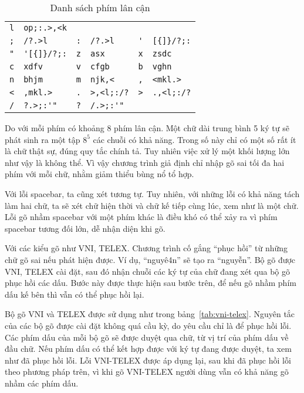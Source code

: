 \documentclass[a4paper,oneside,14pt]{extbook} %
\begin{document}
\begin{table}[htbp]
\begin{tabular}{ll|ll|ll}
\verb#l#&\verb#op;:.>,<k#\\
\verb#;#&\verb#/?.>l#&%
\verb#:#&\verb#/?.>l#&%
\verb#'#&\verb#[{]}/?;:#\\
\verb#"#&\verb#'[{]}/?;:#&%
\verb#z#&\verb#asx#&%
\verb#x#&\verb#zsdc#\\
\verb#c#&\verb#xdfv#&%
\verb#v#&\verb#cfgb#&%
\verb#b#&\verb#vghn#\\
\verb#n#&\verb#bhjm#&%
\verb#m#&\verb#njk,<#&%
\verb#,#&\verb#<mkl.>#\\
\verb#<#&\verb#,mkl.>#&%
\verb#.#&\verb#>,<l;:/?#&%
\verb#>#&\verb#.,<l;:/?#\\
\verb#/#&\verb#?.>;:'"#&%
\verb#?#&\verb#/.>;:'"#&%
\end{tabular}
  \caption{Danh sách phím lân cận}
  \label{tab:neighbor-keys}
\end{table}


Do với mỗi phím có khoảng 8 phím lân cận. Một chữ dài trung bình 5 ký
tự sẽ phát sinh ra một tập $8^5$ các chuỗi có khả năng. Trong số này
chỉ có một số rất ít là chữ thật sự, đúng quy tắc chính tả. Tuy nhiên
việc xử lý một khối lượng lớn như vậy là không thể. Vì vậy chương
trình giả định chỉ nhập gõ sai tối đa hai phím với mỗi chữ, nhằm giảm
thiểu bùng nổ tổ hợp.

Với lỗi spacebar, ta cũng xét tương tự. Tuy nhiên, với những lỗi có
khả năng tách làm hai chữ, ta sẽ xét chữ hiện thời và chữ kế tiếp cùng
lúc, xem như là một chữ. Lỗi gõ nhầm spacebar với một phím khác là
điều khó có thể xảy ra vì phím spacebar tương đối lớn, dễ nhận diện
khi gõ.

Với các kiểu gõ như VNI, TELEX. Chương trình cố gắng ``phục hồi'' từ
những chữ gõ sai nếu phát hiện được. Ví dụ, ``nguyê4n'' sẽ tạo ra
``nguyễn''. Bộ gõ được  VNI, TELEX cài đặt, sau đó nhận chuỗi các ký tự
của chữ đang xét qua bộ gõ phục hồi các dấu. Bước này được thực hiện
sau bước trên, để nếu gõ nhầm phím dấu kế bên thì vẫn có thể phục hồi
lại.

Bộ gõ VNI và TELEX được sử dụng như trong
bảng~\ref{tab:vni-telex}. Nguyên tắc của các bộ gõ được cài đặt không
quá cầu kỳ, do yêu cầu chỉ là để phục hồi lỗi. Các phím dấu của mỗi bộ
gõ sẽ được duyệt qua chữ, từ vị trí của phím dấu về đầu chữ. Nếu phím
dấu có thể kết hợp được với ký tự đang được duyệt, ta xem như đã phục
hồi lỗi. Lỗi VNI-TELEX được áp dụng lại, sau khi đã phục hồi lỗi theo
phương pháp trên, vì khi gõ VNI-TELEX người dùng vẫn có khả năng gõ
nhầm các phím dấu.
\end{document}
